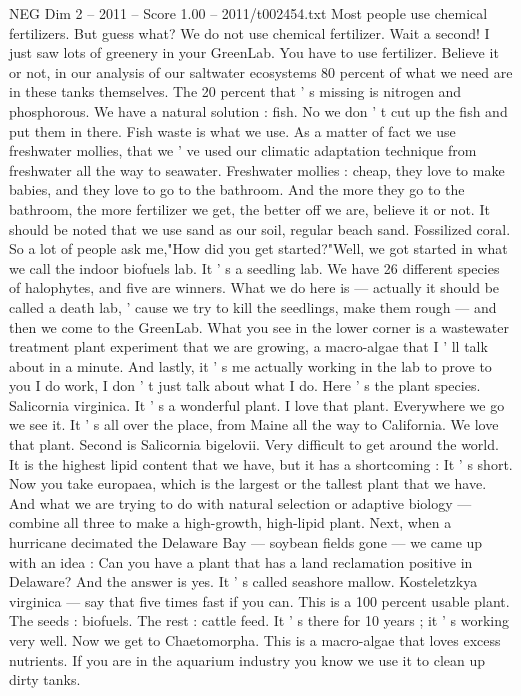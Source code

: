 \begin{textsample}{NEG Dim 2 – 2011 – Score 1.00 – 2011/t002454.txt}
Most people use chemical fertilizers.
But guess what?
We do not use chemical fertilizer.
Wait a second!
I just saw lots of greenery in your GreenLab.
You have to use fertilizer.
Believe it or not, in our analysis of our saltwater ecosystems 80 percent of what we need are in these tanks themselves.
The 20 percent that ' s missing is nitrogen and phosphorous.
We have a natural solution : fish.
No we don ' t cut up the fish and put them in there.
Fish waste is what we use.
As a matter of fact we use freshwater mollies, that we ' ve used our climatic adaptation technique from freshwater all the way to seawater.
Freshwater mollies : cheap, they love to make babies, and they love to go to the bathroom.
And the more they go to the bathroom, the more fertilizer we get, the better off we are, believe it or not.
It should be noted that we use sand as our soil, regular beach sand.
Fossilized coral.
So a lot of people ask me,"How did you get started?"Well, we got started in what we call the indoor biofuels lab.
It ' s a seedling lab.
We have 26 different species of halophytes, and five are winners.
What we do here is — actually it should be called a death lab, ' cause we try to kill the seedlings, make them rough — and then we come to the GreenLab.
What you see in the lower corner is a wastewater treatment plant experiment that we are growing, a macro-algae that I ' ll talk about in a minute.
And lastly, it ' s me actually working in the lab to prove to you I do work, I don ' t just talk about what I do.
Here ' s the plant species.
Salicornia virginica.
It ' s a wonderful plant.
I love that plant.
Everywhere we go we see it.
It ' s all over the place, from Maine all the way to California.
We love that plant.
Second is Salicornia bigelovii.
Very difficult to get around the world.
It is the highest lipid content that we have, but it has a shortcoming : It ' s short.
Now you take europaea, which is the largest or the tallest plant that we have.
And what we are trying to do with natural selection or adaptive biology — combine all three to make a high-growth, high-lipid plant.
Next, when a hurricane decimated the Delaware Bay — soybean fields gone — we came up with an idea : Can you have a plant that has a land reclamation positive in Delaware?
And the answer is yes.
It ' s called seashore mallow.
Kosteletzkya virginica — say that five times fast if you can.
This is a 100 percent usable plant.
The seeds : biofuels.
The rest : cattle feed.
It ' s there for 10 years ; it ' s working very well.
Now we get to Chaetomorpha.
This is a macro-algae that loves excess nutrients.
If you are in the aquarium industry you know we use it to clean up dirty tanks.

\end{textsample}

